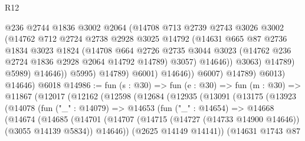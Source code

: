 \begin{lexlean}{R12}
\begin{coremodule}
                              @236
                              @2744
                              @1836
                              @3002
                              @2064
                              (@14708
                                @713
                                @2739
                                @2743
                                @3026
                                @3002
                                (@14762
                                  @712
                                  @2724
                                  @2738
                                  @2928
                                  @3025
                                  @14792
                                  (@14631
                                    @665
                                    @87
                                    @2736
                                    @1834
                                    @3023
                                    @1824
                                    (@14708
                                      @664
                                      @2726
                                      @2735
                                      @3044
                                      @3023
                                      (@14762 @236 @2724 @1836 @2928 @2064 @14792 @14789)
                                      @3057)
                                    @14646))
                                @3063)
                              @14789)
                            @5989)
                          @14646))
                      @5995)
                    @14789)
                  @6001)
                @14646))
            @6007)
          @14789)
        @6013)
      @14646)
    @6018
@14986 := fun (s : @30) =>
  fun (e : @30) =>
  fun (m : @30) =>
  @11867
    (@12017
      (@12162
        (@12598
          (@12684
            (@12935
              (@13091
                (@13175
                  (@13923
                    (@14078
                      (fun ("_" : @14079) =>
                      @14653
                        (fun ("_" : @14654) =>
                        @14668
                          (@14674
                            (@14685
                              (@14701
                                (@14707
                                  (@14715 (@14727 (@14733 @14900 @14646)) (@3055 @14139 @5834))
                                  @14646))
                              (@2625 @14149 @14141))
                            (@14631
                              @1743
                              @87

\end{coremodule}
\end{lexlean}
